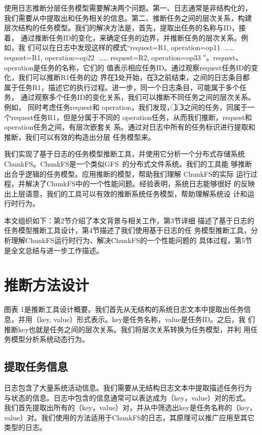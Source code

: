 使用日志推断分层任务模型需要解决两个问题。第一、日志通常是非结构化的，
我们需要从中提取出和任务相关的信息。第二、推断任务之间的层次关系，构建
层次结构的任务模型。我们的解决方法是，首先，提取出任务的名称与ID，接着，
通过推断任务ID的变化，来确定任务的边界，并推断任务的层次关系。例如，我
们可以在日志中发现这样的模式“request=R1, operation=op1\textcircled{1}
……request=R1, operation=op2\textcircled{2} …… request=R2,
operation=op3\textcircled{3}”。request、operation是任务的名称，它们的
值表示相应任务ID。通过观察request任务ID的变化，我们可以推断R1任务的边
界在\textcircled{1}处开始，在\textcircled{3}之前结束，之间的日志条目都
属于任务R1，描述它的执行过程。进一步，同一个日志条目，可能属于多个任务，
通过观察多个任务ID的变化关系，我们可以推断不同任务之间的层次关系。例如，
同时考虑任务request和 operation，我们发现，\textcircled{1}
\textcircled{3}之间的任务，同属于一个request任务R1，但是分属于不同的
operation任务，从而我们推断，request和operation任务之间，有层次嵌套关
系。通过对日志中所有的任务标识进行提取和推断，我们可以有效的构造出分层
任务模型来。

我们实现了基于日志的任务模型推断工具，并使用它分析一个分布式存储系统
ChunkFS。ChunkFS是一个类似GFS~\cite{gfs}的分布式文件系统。我们的工具能
够推断出合乎逻辑的任务模型。应用推断的模型，帮助我们理解 ChunkFS的实际
运行过程，并解决了ChunkFS中的一个性能问题。经验表明，系统日志能够很好
的反映出上层语意，我们的工具可以有效的推断系统任务模型，帮助理解系统设
计和运行时行为。

本文组织如下：第2节介绍了本文背景与相关工作，第3节详细
描述了基于日志的任务模型推断工具设计，第4节描述了我们使用基于日志的任
务模型推断工具，分析理解ChunkFS运行时行为、解决ChunkFS的一个性能问题的
具体过程，第5节是全文总结与进一步工作描述。

\section{推断方法设计}

图表 1是推断工具设计概要。我们首先从无结构的系统日志文本中提取出任务信
息，并用（key, value）形式表示。key是任务名称，value是任务ID。之后，我
们推断key也就是任务之间的层次关系。我们将层次关系转换为任务模型，并利
用任务模型分析系统动态行为。

\subsection{提取任务信息}

日志包含了大量系统活动信息。我们需要从无结构日志文本中提取描述任务行为
与状态的信息。日志中包含的信息通常可以表达成为（key，value）对的形式。
我们首先提取出所有的（key，value）对，并从中筛选出key是任务名称的（key，
value）对。我们使用的方法适用于ChunkFS的日志，其原理可以推广应用至其它
类型的日志。

